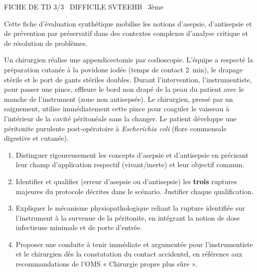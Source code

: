 \documentclass[11pt]{article}
\begin{document}
\begin{tcolorbox}[enhanced,colback=popink,colframe=popink,arc=10pt,boxrule=0pt,left=12pt,right=12pt,top=9pt,bottom=9pt]
{\color{white}\popxbold\small FICHE DE TD 3/3 \textbullet\ DIFFICILE \hfill SVTEEHB \textbullet\ 3ème\par}
\end{tcolorbox}
\vspace{4pt}
Cette fiche d'évaluation synthétique mobilise les notions d'asepsie, d'antisepsie et de prévention par préservatif dans des contextes complexes d'analyse critique et de résolution de problèmes.

\begin{exercice}
Un chirurgien réalise une appendicectomie par cœlioscopie. L'équipe a respecté la préparation cutanée à la povidone iodée (temps de contact \SI{2}{\minute}), le drapage stérile et le port de gants stériles doubles. Durant l'intervention, l'instrumentiste, pour passer une pince, effleure le bord non drapé de la peau du patient avec le manche de l'instrument (zone non antisepsée). Le chirurgien, pressé par un saignement, utilise immédiatement cette pince pour coaguler le vaisseau à l'intérieur de la cavité péritonéale sans la changer. Le patient développe une péritonite purulente post-opératoire à \textit{Escherichia coli} (flore commensale digestive et cutanée).

\begin{enumerate}
    \item Distinguer rigoureusement les concepts d'asepsie et d'antisepsie en précisant leur champ d'application respectif (vivant/inerte) et leur objectif commun.
    \item Identifier et qualifier (erreur d'asepsie ou d'antisepsie) les \textbf{trois} ruptures majeures du protocole décrites dans le scénario. Justifier chaque qualification.
    \item Expliquer le mécanisme physiopathologique reliant la rupture identifiée sur l'instrument à la survenue de la péritonite, en intégrant la notion de dose infectieuse minimale et de porte d'entrée.
    \item Proposer une conduite à tenir immédiate et argumentée pour l'instrumentiste et le chirurgien dès la constatation du contact accidentel, en référence aux recommandations de l'OMS « Chirurgie propre plus sûre ».
\end{enumerate}
\end{exercice}
\end{document}
